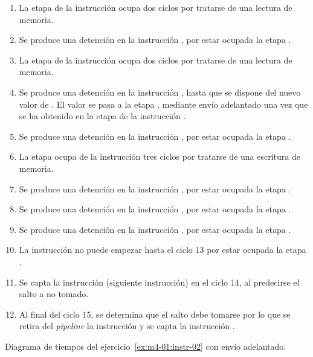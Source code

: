 \begin{enumerate}

\item La etapa  de la instrucción 
      ocupa dos ciclos por tratarse de una lectura de memoria.

\item Se produce una detención en la instrucción , 
      por estar ocupada la etapa .

\item La etapa  de la instrucción 
      ocupa dos ciclos por tratarse de una lectura de memoria.

\item Se produce una detención en la instrucción ,
      hasta que se dispone del nuevo valor de .
      El valor se pasa a la etapa ,
      mediante envío adelantado una vez que se ha obtenido 
      en la etapa  de la instrucción .

\item Se produce una detención en la instrucción ,
      por estar ocupada la etapa .

\item La etapa  ocupa de la instrucción 
      tres ciclos por tratarse de una escritura de memoria.

\item Se produce una detención en la instrucción ,
      por estar ocupada la etapa .

\item Se produce una detención en la instrucción ,
      por estar ocupada la etapa .

\item Se produce una detención en la instrucción ,
      por estar ocupada la etapa .

\item La instrucción  no puede empezar hasta el ciclo
      13 por estar ocupada la etapa .

\item Se capta la instrucción  (siguiente instrucción)
      en el ciclo 14, al predecirse el salto a no tomado.

\item Al final del ciclo 15, se determina que el salto debe tomarse
      por lo que se retira del \emph{pipeline} la instrucción 
      y se capta la instrucción .

\end{enumerate}

\begin{table}[htb]

\caption{Diagrama de tiempos del ejercicio~\ref{ex:m4-01:instr-02} con envío adelantado.}
\label{ex:m4-01:instr-02:chrono:forward}
\end{table}
